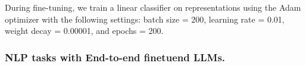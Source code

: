 
During fine-tuning, we train a linear classifier on representations using the Adam optimizer \cite{kingma2014adam} with the following settings: batch size = 200, learning rate = 0.01, weight decay = 0.00001, and epochs = 200.


\subsubsection{NLP tasks with End-to-end finetuend LLMs.}

